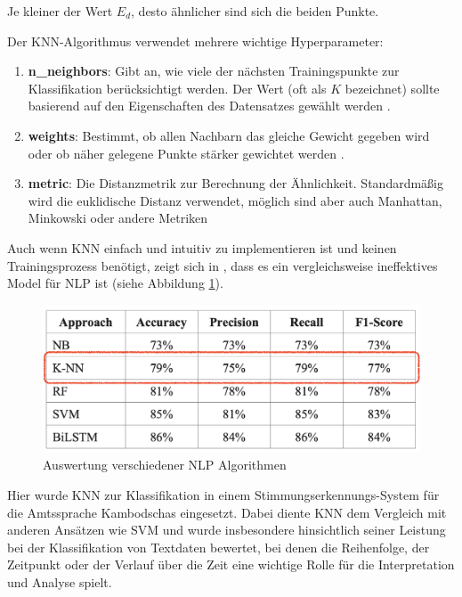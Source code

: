 Je kleiner der Wert \( E_d \), desto ähnlicher sind sich die beiden Punkte.

Der KNN-Algorithmus verwendet mehrere wichtige Hyperparameter:

\begin{enumerate}
    \item \textbf{n\_neighbors}: Gibt an, wie viele der nächsten Trainingspunkte zur Klassifikation berücksichtigt werden. 
    Der Wert (oft als \( K \) bezeichnet) sollte basierend auf den Eigenschaften des Datensatzes gewählt werden \cite{Verma:2024aa, aslam2022}.

    \item \textbf{weights}: Bestimmt, ob allen Nachbarn das gleiche Gewicht gegeben wird oder ob näher gelegene Punkte stärker 
    gewichtet werden \cite{knnparams2024}.

    \item \textbf{metric}: Die Distanzmetrik zur Berechnung der Ähnlichkeit. Standardmäßig wird die euklidische Distanz verwendet, 
    möglich sind aber auch Manhattan, Minkowski oder andere Metriken \cite{aslam2022}
\end{enumerate}

Auch wenn KNN einfach und intuitiv zu implementieren ist und keinen Trainingsprozess benötigt, zeigt sich in \cite{prom2024}, 
dass es ein vergleichsweise ineffektives Model für NLP ist (siehe Abbildung \ref{fig:nlp_models}).

\begin{figure}[htbp]
    \begin{center}
        \includegraphics[scale=0.4]{static/vgl_svm_knn_etc.png}
        \caption{\label{fig:nlp_models} Auswertung verschiedener NLP Algorithmen \cite{prom2024}}
    \end{center}
\end{figure}

Hier wurde KNN zur Klassifikation in einem Stimmungserkennungs-System für die Amtssprache Kambodschas eingesetzt. 
Dabei diente KNN dem Vergleich mit anderen Ansätzen wie SVM und wurde insbesondere hinsichtlich seiner Leistung bei der 
Klassifikation von Textdaten bewertet, bei denen die Reihenfolge, der Zeitpunkt oder der Verlauf über die Zeit eine wichtige Rolle 
für die Interpretation und Analyse spielt.

